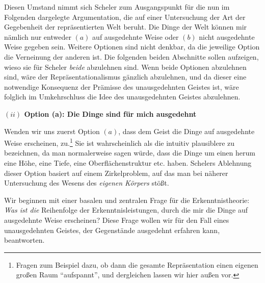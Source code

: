 \documentclass[a4paper, 12pt]{article}
\begin{document}
\begin{onehalfspace}
Diesen Umstand nimmt sich Scheler zum Ausgangspunkt für die nun im Folgenden dargelegte Argumentation, die auf einer Untersuchung der Art der Gegebenheit der repräsentierten Welt beruht. Die Dinge der Welt können mir nämlich nur entweder $(a)$ auf ausgedehnte Weise oder $(b)$ nicht ausgedehnte Weise gegeben sein. Weitere Optionen sind nicht denkbar, da die jeweilige Option die Verneinung der anderen ist. Die folgenden beiden Abschnitte sollen aufzeigen, wieso sie für Scheler \emph{beide} abzulehnen sind. Wenn beide Optionen abzulehnen sind, wäre der Repräsentationalismus gänzlich abzulehnen, und da dieser eine notwendige Konsequenz der Prämisse des unausgedehnten Geistes ist, wäre folglich im Umkehrschluss die Idee des unausgedehnten Geistes abzulehnen.

\vspace{5mm}
\noindent\textbf{$(ii)$ Option (a): Die Dinge sind für mich ausgedehnt}


\noindent Wenden wir uns zuerst Option $(a)$, dass dem Geist die Dinge auf ausgedehnte Weise erscheinen, zu.\footnote{Fragen zum Beispiel dazu, ob dann die gesamte Repräsentation einen eigenen großen Raum "`aufspannt"', und dergleichen lassen wir hier außen vor.} Sie ist wahrscheinlich als die intuitiv plausiblere zu bezeichnen, da man normalerweise sagen würde, dass die Dinge um einen herum eine Höhe, eine Tiefe, eine Oberflächenstruktur etc. haben. Schelers Ablehnung dieser Option basiert auf einem Zirkelproblem, auf das man bei näherer Untersuchung des Wesens des \emph{eigenen Körpers} stößt.


Wir beginnen mit einer basalen und zentralen Frage für die Erkenntnistheorie: \emph{Was ist die} Reihenfolge der Erkenntnisleistungen, durch die mir die Dinge auf ausgedehnte Weise erscheinen? Diese Frage wollen wir für den Fall eines unausgedehnten Geistes, der Gegenstände ausgedehnt erfahren kann, beantworten. 


\end{onehalfspace}
\end{document}
